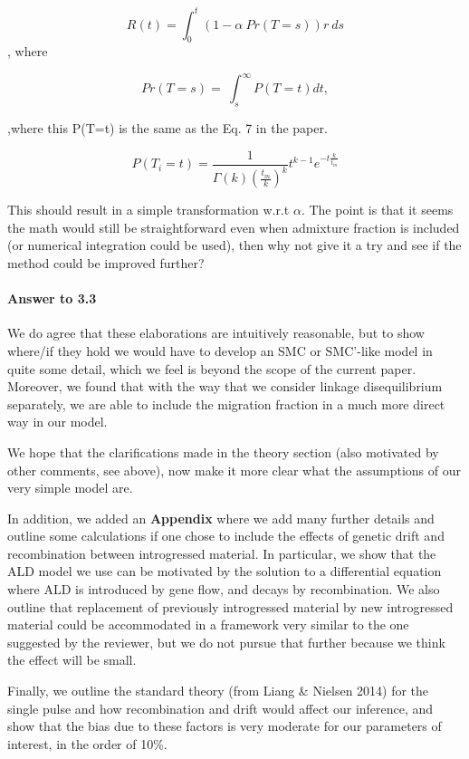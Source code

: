 \documentclass[11pt]{article}
\let\oldparagraph\paragraph
\renewcommand{\paragraph}[1]{\oldparagraph{#1}\mbox{}}
\begin{document}
$$R(t) = \int_{0}^{t}{\left(1-\alpha\ Pr(T=s)\right)r\ ds}$$,
 where 

$$Pr\left(T=s\right)=\ \int_{s}^{\infty}P\left(T=t\right)dt,$$

,where this P(T=t) is the same as the Eq. 7 in the paper.
 
$$  P(T_i=t)=\frac{1}{\Gamma(k)(\frac{t_m}{k})^k}t^{k-1}e^{-t\frac{k}{t_m}}$$
 
This should result in a simple transformation w.r.t $\alpha$. The point is that it seems the math would still be straightforward even when admixture fraction is included (or numerical integration could be used), then why not give it a try and see if the method could be improved further?

\paragraph{Answer to 3.3}
We do agree that these elaborations are intuitively reasonable, but to show where/if they hold we would have to develop an SMC or SMC'-like model in quite some detail, which we feel is beyond the scope of the current paper. Moreover, we found that with the way that we consider linkage disequilibrium separately, we are able to include the migration fraction in a much more direct way in our model. 

We hope that the clarifications made in the theory section (also motivated by other comments, see above), now make it more clear what the assumptions of our very simple model are.

In addition, we added an \textbf{Appendix} where we add many further details and outline some calculations if one chose to include the effects of genetic drift and recombination between introgressed material. In particular, we show that the ALD model we use can be motivated by the solution to a differential equation where ALD is introduced by gene flow, and decays by recombination. We also outline that replacement of previously introgressed material by new introgressed material could be accommodated in a framework very similar to the one suggested by the reviewer, but we do not pursue that further because we think the effect will be small.

Finally, we outline the standard theory (from Liang \& Nielsen 2014) for the single pulse and how recombination and drift would affect our inference, and show that the bias due to these factors is very moderate for our parameters of interest, in the order of 10\%.
\end{document}
